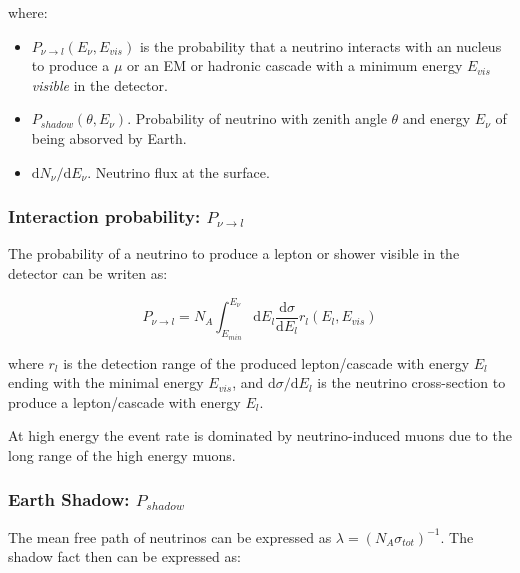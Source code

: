 \documentclass[
  letterpaper,
  DIV=11,
  numbers=noendperiod]{scrreprt}
\providecommand{\tightlist}{%
  \setlength{\itemsep}{0pt}\setlength{\parskip}{0pt}}\usepackage{longtable,booktabs,array}
\begin{document}
where:

\begin{itemize}
\tightlist
\item
  \(P_{\nu\rightarrow l}(E_\nu, E_{vis})\) is the probability that a
  neutrino interacts with an nucleus to produce a \(\mu\) or an EM or
  hadronic cascade with a minimum energy \(E_{vis}\) \emph{visible} in
  the detector.
\item
  \(P_{shadow} (\theta, E_\nu)\). Probability of neutrino with zenith
  angle \(\theta\) and energy \(E_\nu\) of being absorved by Earth.
\item
  \({\mathrm{ d}N_\nu}/{\mathrm{ d}E_\nu}\). Neutrino flux at the
  surface.
\end{itemize}

\subsubsection*{\texorpdfstring{Interaction probability:
\(P_{\nu\rightarrow l}\)}{Interaction probability: P\_\{\textbackslash nu\textbackslash rightarrow l\}}}\label{interaction-probability-p_nurightarrow-l}

The probability of a neutrino to produce a lepton or shower visible in
the detector can be writen as:

\[P_{\nu \rightarrow l} = N_A \int_{E_{min}}^{E_\nu} \mathrm{ d}E_l \frac{\mathrm{ d}\sigma}{\mathrm{ d}E_l}r_l(E_l, E_{vis})\]

where \(r_l\) is the detection range of the produced lepton/cascade with
energy \(E_l\) ending with the minimal energy \(E_{vis}\), and
\({\mathrm{ d}\sigma}/{\mathrm{ d}E_l}\) is the neutrino cross-section
to produce a lepton/cascade with energy \(E_l\).

At high energy the event rate is dominated by neutrino-induced muons due
to the long range of the high energy muons.

\subsubsection*{\texorpdfstring{Earth Shadow:
\(P_{shadow}\)}{Earth Shadow: P\_\{shadow\}}}\label{earth-shadow-p_shadow}

The mean free path of neutrinos can be expressed as
\(\lambda = (N_A \sigma_{tot})^{-1}\). The shadow fact then can be
expressed as:
\end{document}
